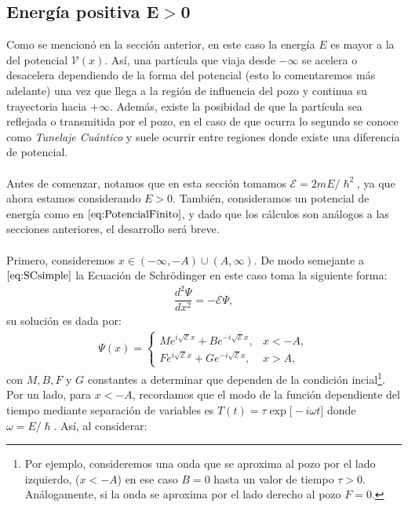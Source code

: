 \documentclass[12pt]{article}
\theoremstyle{definition}
\begin{document}
\subsection{Energía positiva $\boldsymbol{E>0}$}
\label{sec:Energia}
\noindent
Como se mencionó en la sección anterior, en este caso la energía $E$ es mayor a la del potencial $\mathcal{V}(x)$. Así, una partícula que viaja desde $-\infty$ se acelera o desacelera dependiendo de la forma del potencial (esto lo comentaremos más adelante) una vez que llega a la región de influencia del pozo y continua su trayectoria hacia $+\infty$. Además, existe la posibidad de que la partícula sea reflejada o transmitida por el pozo, en el caso de que ocurra lo segundo se conoce como \textit{Tunelaje Cuántico} y suele ocurrir entre regiones donde existe una diferencia de potencial. 
\\ \\
Antes de comenzar, notamos que en esta sección tomamos $\mathcal{E} = 2mE/\hslash^2$, ya que ahora estamos considerando $E>0$. También, consideramos un potencial de energía como en $\eqref{eq:PotencialFinito}$, y
dado que los cálculos son análogos a las secciones anteriores, el desarrollo será breve.
\\ \\
Primero, consideremos $x \in (-\infty,-A)\cup (A,\infty)$. De modo semejante a $\eqref{eq:SCsimple}$ la Ecuación de Schrödinger en este caso toma la siguiente forma:
\begin{align*}
    \dfrac{d^2\Psi}{dx^2} = -\mathcal{E}\Psi,
\end{align*}
su solución es dada por:
\begin{align*}
        \Psi(x) = 
        \left\{ \begin{array}{ll}
        Me^{i\sqrt{\mathcal{E}}x}+Be^{-i\sqrt{\mathcal{E}}x}, & x<-A,
        \\ Fe^{i\sqrt{\mathcal{E}}x}+Ge^{-i\sqrt{\mathcal{E}}x} ,& x > A,
        \end{array}
        \right.
\end{align*}
\noindent
con $M, B, F$ y $G$ constantes a determinar que dependen de la condición incial\footnote{Por ejemplo, consideremos una  onda que se aproxima al pozo por el lado izquierdo, ($x<-A$) en ese caso $B=0$ hasta un valor de tiempo $\tau > 0$. Análogamente, si la onda se aproxima por el lado derecho al pozo $F = 0$.}. Por un lado, para $x < - A$, recordamos que el modo de la función dependiente del tiempo mediante separación de variables es $T(t) = \tau\exp\big[-i\omega t\big]$ donde $\omega = E/\hslash$. Así, al considerar:
\end{document}
